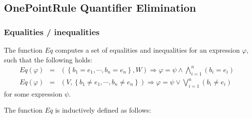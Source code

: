 \subsection{OnePointRule Quantifier Elimination}

\subsubsection{Equalities / inequalities}

The function $Eq$ computes a set of equalities and inequalities for an
expression $\varphi $, such that the following holds:%
\begin{eqnarray*}
Eq\left( \varphi \right)  &=&\left( \left\{ b_{1}=e_{1},\cdots
,b_{n}=e_{n}\right\} ,W\right) \Rightarrow \varphi =\psi \wedge
\bigwedge\limits_{i=1}^{n}\left( b_{i}=e_{i}\right)  \\
Eq\left( \varphi \right)  &=&\left( V,\left\{ b_{1}\neq e_{1},\cdots
,b_{n}\neq e_{n}\right\} \right) \Rightarrow \varphi =\psi \vee
\bigvee\limits_{i=1}^{n}\left( b_{i}\neq e_{i}\right) 
\end{eqnarray*}%
for some expression $\psi $.

The function $Eq$ is inductively defined as follows:


